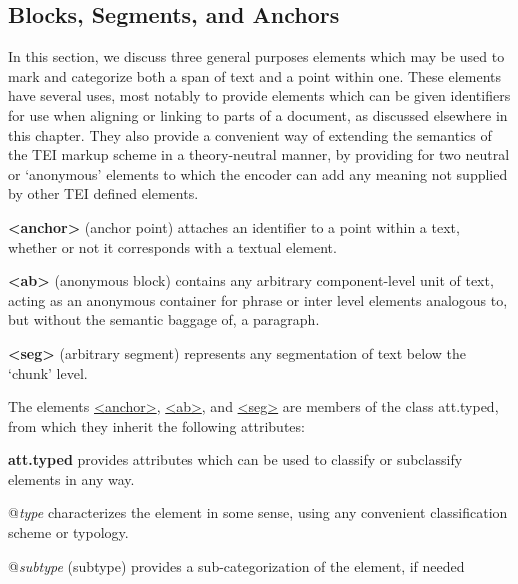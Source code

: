 \subsection[{Blocks, Segments, and Anchors}]{Blocks, Segments, and Anchors}\label{SASE}\par
In this section, we discuss three general purposes elements which may be used to mark and categorize both a span of text and a point within one. These elements have several uses, most notably to provide elements which can be given identifiers for use when aligning or linking to parts of a document, as discussed elsewhere in this chapter. They also provide a convenient way of extending the semantics of the TEI markup scheme in a theory-neutral manner, by providing for two neutral or ‘anonymous’ elements to which the encoder can add any meaning not supplied by other TEI defined elements. 
\begin{sansreflist}
  
\item [\textbf{<anchor>}] (anchor point) attaches an identifier to a point within a text, whether or not it corresponds with a textual element.
\item [\textbf{<ab>}] (anonymous block) contains any arbitrary component-level unit of text, acting as an anonymous container for phrase or inter level elements analogous to, but without the semantic baggage of, a paragraph.
\item [\textbf{<seg>}] (arbitrary segment) represents any segmentation of text below the ‘chunk’ level.
\end{sansreflist}
 The elements \hyperref[TEI.anchor]{<anchor>}, \hyperref[TEI.ab]{<ab>}, and \hyperref[TEI.seg]{<seg>} are members of the class \textsf{att.typed}, from which they inherit the following attributes: 
\begin{sansreflist}
  
\item [\textbf{att.typed}] provides attributes which can be used to classify or subclassify elements in any way.\hfil\\[-10pt]\begin{sansreflist}
    \item[@{\itshape type}]
  characterizes the element in some sense, using any convenient classification scheme or typology.
    \item[@{\itshape subtype}]
  (subtype) provides a sub-categorization of the element, if needed
\end{sansreflist}  
\end{sansreflist}
